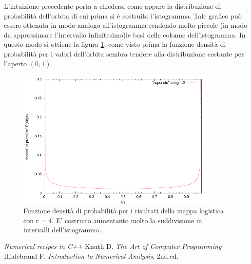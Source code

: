 \documentclass[13pt]{article}
\begin{document}
L'intuizione precedente porta a chiedersi come appare la distribuzione di probabilità dell'orbita di cui prima si è costruito l'istogramma.
Tale grafico può essere ottenuta in modo analogo all'istogramma rendendo molto piccole (in modo da approssimare l'intervallo infinitesimo)le basi delle colonne dell'istogramma.
In questo modo si ottiene la figura \ref{fig:densit}, come visto prima la funzione densità di probabilità per i valori dell'orbita sembra tendere alla distribuzione costante per l'aperto $(0,1)$.
\begin{figure}[!h]
\centering
\includegraphics[width=10cm,keepaspectratio]{picture/mappacaos/superisto}
\caption{Funzione densità di probabilità per i risultati della mappa logistica con r = 4. E' costruito aumentanto molto la suddivisione in intervalli dell'istogramma.}
\label{fig:densit}
\end{figure}





\clearpage
\begin{thebibliography}{99}
\emph{Numerical recipes in C++}
Knuth D. \emph{The Art of Computer Programming}
Hildebrand F. \emph{Introduction to Numerical Analysis}, 2nd.ed.
\end{thebibliography}
\end{document}
